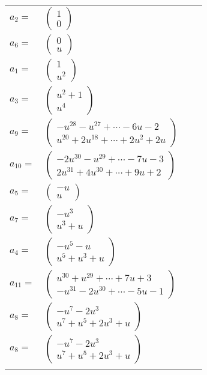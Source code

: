 \documentclass[1p]{elsarticle_modified}
\theoremstyle{definition}
\begin{document}
\begin{tabular}{m{7pt} m{180pt} m{7pt} m{180pt} }
\flushright $a_{2}=$&$\begin{pmatrix}1\\0\end{pmatrix}$ \\
\flushright $a_{6}=$&$\begin{pmatrix}0\\u\end{pmatrix}$ \\
\flushright $a_{1}=$&$\begin{pmatrix}1\\u^2\end{pmatrix}$ \\
\flushright $a_{3}=$&$\begin{pmatrix}u^2+1\\u^4\end{pmatrix}$ \\
\flushright $a_{9}=$&$\begin{pmatrix}- u^{28}- u^{27}+\cdots-6 u-2\\u^{20}+2 u^{18}+\cdots+2 u^2+2 u\end{pmatrix}$ \\
\flushright $a_{10}=$&$\begin{pmatrix}-2 u^{30}- u^{29}+\cdots-7 u-3\\2 u^{31}+4 u^{30}+\cdots+9 u+2\end{pmatrix}$ \\
\flushright $a_{5}=$&$\begin{pmatrix}- u\\u\end{pmatrix}$ \\
\flushright $a_{7}=$&$\begin{pmatrix}- u^3\\u^3+u\end{pmatrix}$ \\
\flushright $a_{4}=$&$\begin{pmatrix}- u^5- u\\u^5+u^3+u\end{pmatrix}$ \\
\flushright $a_{11}=$&$\begin{pmatrix}u^{30}+u^{29}+\cdots+7 u+3\\- u^{31}-2 u^{30}+\cdots-5 u-1\end{pmatrix}$ \\
\flushright $a_{8}=$&$\begin{pmatrix}- u^7-2 u^3\\u^7+u^5+2 u^3+u\end{pmatrix}$\\ \flushright $a_{8}=$&$\begin{pmatrix}- u^7-2 u^3\\u^7+u^5+2 u^3+u\end{pmatrix}$\\&\end{tabular}
\end{document}
